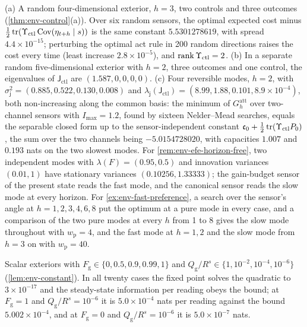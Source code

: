 \begin{numcheck}\label{chk:env-control}
(a) A random four-dimensional exterior, $h=3$, two controls and three outcomes (\cref{thm:env-control}(a)). Over six random sensors, the optimal expected cost minus $\frac12\operatorname{tr}(\Upsilon_{\mathrm{ctl}}\operatorname{Cov}(\eta_{t+h}\mid s))$ is the same constant $5.5301278619$, with spread $4.4\times10^{-15}$; perturbing the optimal act rule in 200 random directions raises the cost every time (least increase $2.8\times10^{-5}$), and $\operatorname{rank}\Upsilon_{\mathrm{ctl}}=2$. (b) In a separate random five-dimensional exterior with $h=2$, three outcomes and one control, the eigenvalues of $\mathsf J_{\mathrm{ctl}}$ are $(1.587,0,0,0,0)$. (c) Four reversible modes, $h=2$, with $\sigma_{\mathsf j}^2=(0.885,0.522,0.130,0.008)$ and $\lambda_{\mathsf j}(\mathsf J_{\mathrm{ctl}})=(8.99,1.88,0.101,8.9\times10^{-4})$, both non-increasing along the common basis: the minimum of $G^{\mathrm{att}}_h$ over two-channel sensors with $I_{\max}=1.2$, found by sixteen Nelder--Mead searches, equals the separable closed form up to the sensor-independent constant $\mathfrak c_0+\frac12\operatorname{tr}(\Upsilon_{\mathrm{ctl}}P_0)$, the sum over the two channels being $-5.0154728020$, with capacities $1.007$ and $0.193$ nats on the two slowest modes. For \cref{rem:env-efe-horizon-free}, two independent modes with $\lambda(F)=(0.95,0.5)$ and innovation variances $(0.01,1)$ have stationary variances $(0.10256,1.33333)$; the gain-budget sensor of the present state reads the fast mode, and the canonical sensor reads the slow mode at every horizon. For \cref{ex:env-fast-preference}, a search over the sensor's angle at $h=1,2,3,4,6,8$ put the optimum at a pure mode in every case, and a comparison of the two pure modes at every $h$ from 1 to 8 gives the slow mode throughout with $w_{\mathrm p}=4$, and the fast mode at $h=1,2$ and the slow mode from $h=3$ on with $w_{\mathrm p}=40$.
\end{numcheck}

\begin{numcheck}\label{chk:env-constant}
Scalar exteriors with $F_{\mathrm g}\in\{0,0.5,0.9,0.99,1\}$ and $Q_{\mathrm g}/R^s\in\{1,10^{-2},10^{-4},10^{-6}\}$ (\cref{lem:env-constant}). In all twenty cases the fixed point solves the quadratic to $3\times10^{-17}$ and the steady-state information per reading obeys the bound; at $F_{\mathrm g}=1$ and $Q_{\mathrm g}/R^s=10^{-6}$ it is $5.0\times10^{-4}$ nats per reading against the bound $5.002\times10^{-4}$, and at $F_{\mathrm g}=0$ and $Q_{\mathrm g}/R^s=10^{-6}$ it is $5.0\times10^{-7}$ nats.
\end{numcheck}


